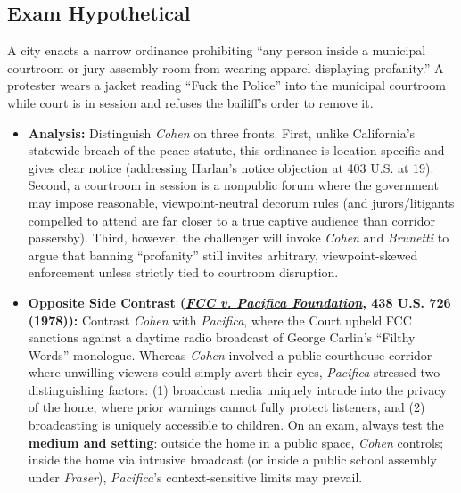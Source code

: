 \documentclass[12pt]{article}
\begin{document}
\subsection*{Exam Hypothetical}
A city enacts a narrow ordinance prohibiting ``any person inside a municipal courtroom or jury-assembly room from wearing apparel displaying profanity.'' A protester wears a jacket reading ``Fuck the Police'' into the municipal courtroom while court is in session and refuses the bailiff's order to remove it.
\begin{itemize}
  \item \textbf{Analysis:} Distinguish \textit{Cohen} on three fronts. First, unlike California's statewide breach-of-the-peace statute, this ordinance is location-specific and gives clear notice (addressing Harlan's notice objection at 403 U.S. at 19). Second, a courtroom in session is a nonpublic forum where the government may impose reasonable, viewpoint-neutral decorum rules (and jurors/litigants compelled to attend are far closer to a true captive audience than corridor passersby). Third, however, the challenger will invoke \textit{Cohen} and \textit{Brunetti} to argue that banning ``profanity'' still invites arbitrary, viewpoint-skewed enforcement unless strictly tied to courtroom disruption.
  \item \textbf{Opposite Side Contrast (\href{https://supreme.justia.com/cases/federal/us/438/726/}{\textit{FCC v. Pacifica Foundation}}, 438 U.S. 726 (1978)):} Contrast \textit{Cohen} with \textit{Pacifica}, where the Court upheld FCC sanctions against a daytime radio broadcast of George Carlin's ``Filthy Words'' monologue. Whereas \textit{Cohen} involved a public courthouse corridor where unwilling viewers could simply avert their eyes, \textit{Pacifica} stressed two distinguishing factors: (1) broadcast media uniquely intrude into the privacy of the home, where prior warnings cannot fully protect listeners, and (2) broadcasting is uniquely accessible to children. On an exam, always test the \textbf{medium and setting}: outside the home in a public space, \textit{Cohen} controls; inside the home via intrusive broadcast (or inside a public school assembly under \textit{Fraser}), \textit{Pacifica}'s context-sensitive limits may prevail.
\end{itemize}
\end{document}
